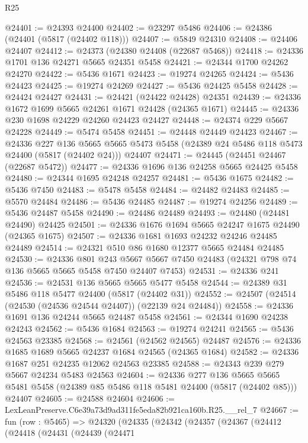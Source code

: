 \begin{lexlean}{R25}
\begin{coremodule}
@24401 := @24393 @24400
@24402 := @23297 @5486
@24406 := @24386 (@24401 (@5817 (@24402 @118)))
@24407 := @5849 @24310
@24408 := @24406 @24407
@24412 := @24373 (@24380 @24408 (@22687 @5468))
@24418 := @24336 @1701 @136 @24271 @5665 @24351 @5458
@24421 := @24344 @1700 @24262 @24270
@24422 := @5436 @1671
@24423 := @19274 @24265
@24424 := @5436 @24423
@24425 := @19274 @24269
@24427 := @5436 @24425 @5458
@24428 := @24424 @24427
@24431 := @24421 (@24422 @24428) @24351
@24439 := @24336 @1672 @1699 @5665 @24261 @1671 @24428 (@24365 @1671)
@24445 := @24336 @230 @1698 @24229 @24260 @24423 @24427
@24448 := @24374 @229 @5667 @24228
@24449 := @5474 @5458
@24451 := @24448 @24449 @24423
@24467 := @24336
    @227
    @136
    @5665
    @5665
    @5473
    @5458
    (@24389 @24 @5486 @118 @5473 @24400 (@5817 (@24402 @24)))
    @24407
@24471 := @24445 (@24451 @24467 (@22687 @5472))
@24477 := @24336 @1696 @136 @24258 @5665 @24425 @5458
@24480 := @24344 @1695 @24248 @24257
@24481 := @5436 @1675
@24482 := @5436 @7450
@24483 := @5478 @5458
@24484 := @24482 @24483
@24485 := @5570 @24484
@24486 := @5436 @24485
@24487 := @19274 @24256
@24489 := @5436 @24487 @5458
@24490 := @24486 @24489
@24493 := @24480 (@24481 @24490) @24425
@24501 := @24336 @1676 @1694 @5665 @24247 @1675 @24490 (@24365 @1675)
@24507 := @24336 @1681 @1693 @24232 @24246 @24485 @24489
@24514 := @24321 @510 @86 @1680 @12377 @5665 @24484 @24485
@24530 := @24336
    @801
    @243
    @5667
    @5667
    @7450
    @24483
    (@24321 @798 @74 @136 @5665 @5665 @5458 @7450 @24407 @7453)
@24531 := @24336 @241
@24536 := @24531 @136 @5665 @5665 @5477 @5458
@24544 := @24389 @31 @5486 @118 @5477 @24400 (@5817 (@24402 @31))
@24552 := @24507 (@24514 (@24530 (@24536 @24544 @24407)) (@22139 @24 @24484))
@24558 := @24336 @1691 @136 @24244 @5665 @24487 @5458
@24561 := @24344 @1690 @24238 @24243
@24562 := @5436 @1684
@24563 := @19274 @24241
@24565 := @5436 @24563 @23385
@24568 := @24561 (@24562 @24565) @24487
@24576 := @24336 @1685 @1689 @5665 @24237 @1684 @24565 (@24365 @1684)
@24582 := @24336 @1687 @251 @24235 @12062 @24563 @23385
@24588 := @24343 @239 @279 @5667 @24234 @5483 @24563
@24604 := @24336
    @277
    @136
    @5665
    @5665
    @5481
    @5458
    (@24389 @85 @5486 @118 @5481 @24400 (@5817 (@24402 @85)))
    @24407
@24605 := @24588 @24604
@24606 := LexLeanPreserve.C6e39a73d9ad311fe5eda82b921ca160b.R25.__rel_7
@24667 := fun (row : @5465) =>
  @24320
    (@24335
      (@24342
        (@24357
          (@24367
            (@24412
              (@24418
                (@24431
                  (@24439
                    (@24471

\end{coremodule}
\end{lexlean}
